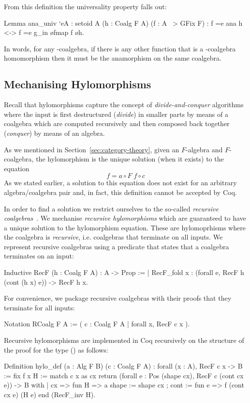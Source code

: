 \documentclass[a4paper,anonymous, UKenglish,cleveref, autoref, thm-restate]{lipics-v2021}
\begin{document}
\noindent
From this definition the universality property falls out:
\begin{coqcode}
Lemma ana_univ `{eA : setoid A} (h : Coalg F A) (f : A ~> GFix F)
: f =e ana h <-> f =e g_in \o fmap f \o h.
\end{coqcode}
In words, for any -coalgebra, if there is any other function 
that is a -coalgebra homomorphism then it must be the anamorphism on the
same coalgebra.

\subsection{Mechanising Hylomorphisms}
\label{sec:coq-rec-coalgebras}
Recall that hylomorphisms capture the concept of \emph{divide-and-conquer}
algorithms where the input is first destructured (\emph{divide}) in smaller
parts by means of a coalgebra which are computed recursively and then composed
back together (\emph{conquer}) by means of an algebra.

As we mentioned in Section~\ref{sec:category-theory}, given an $F$-algebra and
$F$-coalgebra, the hylomorphism is the unique solution (when it exists) to the
equation
\[
  f = a \circ F\; f \circ c
\]
As we stated earlier, a solution to this equation does not exist for an
arbitrary  algebra/coalgebra pair and, in fact, this definition cannot be
accepted by Coq.

In order to find a solution we restrict ourselves to the so-called
\emph{recursive coalgebras}~\cite{AdamekMM19,CaprettaUV04}.  We mechanise
\emph{recursive hylomorphisms} which are guaranteed to have a unique solution to
the hylomorphism equation. These are hylomoprhisms where the coalgebra is
\emph{recursive}, i.e. coalgebras that terminate on all inputs. We represent
recursive coalgebras using a predicate that states that a coalgebra terminates
on an input:
\begin{coqcode}
Inductive RecF (h : Coalg F A) : A -> Prop :=
| RecF_fold x : (forall e, RecF h (cont (h x) e)) -> RecF h x.
\end{coqcode}

\noindent
For convenience, we package recursive coalgebras with their proofs that they
terminate for all inputs:
\begin{coqcode}
Notation RCoalg F A := ({ c : Coalg F A | forall x, RecF c x }).
\end{coqcode}
Recursive hylomorphisms are implemented in Coq recursively on the structure of
the proof for the type () as follows:
\begin{coqcode}
Definition hylo_def (a : Alg F B) (c : Coalg F A)
  : forall (x : A), RecF c x -> B
  := fix f x H
     := match c x as cx
          return (forall e : Pos (shape cx), RecF c (cont cx e)) -> B
        with
        | cx => fun H =>
            a { shape := shape cx ; cont := fun e => f (cont cx e) (H e) }
        end (RecF_inv H).
\end{coqcode}
\end{document}
